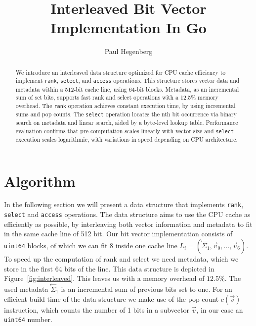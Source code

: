 \documentclass[a4paper,UKenglish,cleveref, autoref, thm-restate]{lipics-v2021}
\title{Interleaved Bit Vector Implementation In Go}
\author{Paul Hegenberg}{Karlsruher Institut für Technologie, Germany \and \url{https://github.com/paulheg/kit_advanced_data_structures}}{urlgh@student.kit.edu}{}{}%
\def\code#1{\texttt{#1}}
\newcommand\prevsum[0]{\ensuremath{\overset{\leftarrow}{\Sigma}_1}}
\begin{document}
\maketitle

\begin{abstract}
We introduce an interleaved data structure optimized for CPU cache efficiency to implement \code{rank},
\code{select}, and \code{access} operations. This structure stores vector data and metadata within a
512-bit cache line, using 64-bit blocks. Metadata, as an incremental sum of set bits, supports fast 
rank and select operations with a 12.5\% memory overhead.
The \code{rank} operation achieves constant execution time, by using incremental sums and pop counts.
The \code{select} operation locates the nth bit occurrence via binary search on metadata and linear search,
aided by a byte-level lookup table.
Performance evaluation confirms that pre-computation scales linearly with vector size and \code{select}
execution scales logarithmic, with variations in speed depending on CPU architecture.
\end{abstract}

\section{Algorithm}
In the following section we will present a data structure
that implements \code{rank}, \code{select} and \code{access} operations.
The data structure aims to use the CPU cache as efficiently as possible, by interleaving both
vector information and metadata to fit in the same cache line of 512 bit.
Our bit vector implementation consists of \code{uint64} blocks, of which we can fit 8 inside one cache line
$L_i = (\prevsum, \vec{v}_0, \dots, \vec{v}_6)$.
To speed up the computation of rank and select we need metadata, which we store in the first
64 bits of the line.
This data structure is depicted in Figure~\ref{fig:interleaved}. 
This leaves us with a memory overhead of $12.5\%$. The used metadata $\prevsum$ is an incremental sum of previous bits
set to one. For an efficient build time of the data structure we make use of the pop count $c(\vec{v})$
instruction, which counts the number of 1 bits in a subvector $\vec{v}$, in our case an \code{uint64} number.
\end{document}
